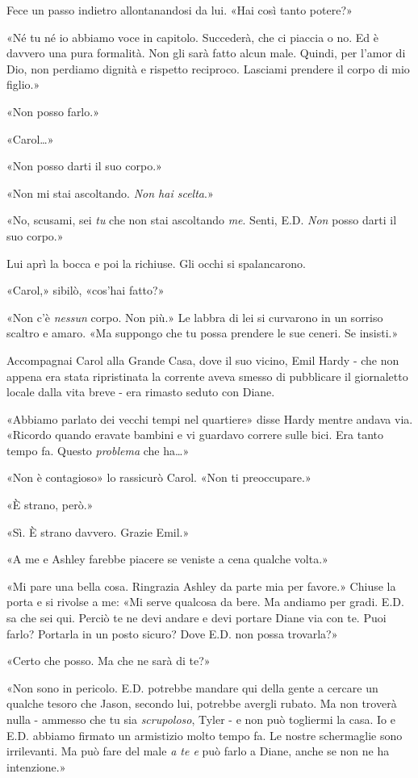 Fece un passo indietro allontanandosi da lui. «Hai così tanto potere?»

«Né tu né io abbiamo voce in capitolo. Succederà, che ci piaccia o no.
Ed è davvero una pura formalità. Non gli sarà fatto alcun male. Quindi,
per l'amor di Dio, non perdiamo dignità e rispetto reciproco. Lasciami
prendere il corpo di mio figlio.»

«Non posso farlo.»

«Carol\ldots»

«Non posso darti il suo corpo.»

«Non mi stai ascoltando. \emph{Non hai scelta}.»

«No, scusami, sei \emph{tu} che non stai ascoltando \emph{me}. Senti,
E.D. \emph{Non} posso darti il suo corpo.»

Lui aprì la bocca e poi la richiuse. Gli occhi si spalancarono.

«Carol,» sibilò, «cos'hai fatto?»

«Non c'è \emph{nessun} corpo. Non più.» Le labbra di lei si curvarono in
un sorriso scaltro e amaro. «Ma suppongo che tu possa prendere le sue
ceneri. Se insisti.»

\separatorefiori

Accompagnai Carol alla Grande Casa, dove il suo vicino, Emil Hardy - che
non appena era stata ripristinata la corrente aveva smesso di pubblicare
il giornaletto locale dalla vita breve - era rimasto seduto con Diane.

«Abbiamo parlato dei vecchi tempi nel quartiere» disse Hardy mentre
andava via. «Ricordo quando eravate bambini e vi guardavo correre sulle
bici. Era tanto tempo fa. Questo \emph{problema} che ha\ldots»

«Non è contagioso» lo rassicurò Carol. «Non ti preoccupare.»

«È strano, però.»

«Sì. È strano davvero. Grazie Emil.»

«A me e Ashley farebbe piacere se veniste a cena qualche volta.»

«Mi pare una bella cosa. Ringrazia Ashley da parte mia per favore.»
Chiuse la porta e si rivolse a me: «Mi serve qualcosa da bere. Ma
andiamo per gradi. E.D. sa che sei qui. Perciò te ne devi andare e devi
portare Diane via con te. Puoi farlo? Portarla in un posto sicuro? Dove
E.D. non possa trovarla?»

«Certo che posso. Ma che ne sarà di te?»

«Non sono in pericolo. E.D. potrebbe mandare qui della gente a cercare
un qualche tesoro che Jason, secondo lui, potrebbe avergli rubato. Ma
non troverà nulla - ammesso che tu sia \emph{scrupoloso}, Tyler - e non
può togliermi la casa. Io e E.D. abbiamo firmato un armistizio molto
tempo fa. Le nostre schermaglie sono irrilevanti. Ma può fare del male
\emph{a te e} può farlo a Diane, anche se non ne ha intenzione.»

